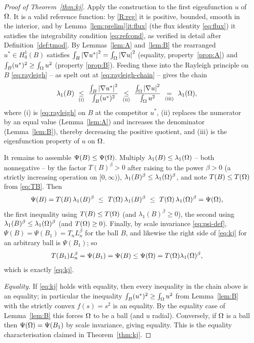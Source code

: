 \begin{proof}[Proof of Theorem~\ref{thm:kj}]
Apply the construction to the first eigenfunction $u$ of $\Omega$. It is a
valid reference function: by \ref{R:reg} it is positive, bounded, smooth in
the interior, and by Lemma~\ref{lem:prelim}\ref{it:flux} (the flux identity
\eqref{eq:flux}) it satisfies the integrability condition
\eqref{eq:refcond}, as verified in detail after Definition~\ref{def:tmod}.
By Lemmas~\ref{lem:A} and~\ref{lem:B} the rearranged $u^*\in H^1_0(B)$
satisfies $\int_B\left|\nabla u^*\right|^2=\int_\Omega\left|\nabla u\right|^2$ (equality,
property~\ref{prop:A}) and $\int_B(u^*)^2\ge\int_\Omega u^2$ (property
\ref{prop:B}). Feeding these into the Rayleigh principle on $B$
\eqref{eq:rayleigh} -- as spelt out at \eqref{eq:rayleigh-chain} -- gives the
chain
\[
  \lambda_1(B)
  \ \underset{\text{(i)}}{\le}\
  \frac{\int_B\left|\nabla u^*\right|^2}{\int_B(u^*)^2}
  \ \underset{\text{(ii)}}{\le}\
  \frac{\int_\Omega\left|\nabla u\right|^2}{\int_\Omega u^2}
  \ \underset{\text{(iii)}}{=}\
  \lambda_1(\Omega),
\]
where (i) is \eqref{eq:rayleigh} on $B$ at the competitor $u^*$, (ii)
replaces the numerator by an equal value (Lemma~\ref{lem:A}) and increases
the denominator (Lemma~\ref{lem:B}), thereby decreasing the positive
quotient, and (iii) is the eigenfunction property of $u$ on $\Omega$.

It remains to assemble $\Psi(B)\le\Psi(\Omega)$. Multiply
$\lambda_1(B)\le\lambda_1(\Omega)$ -- both nonnegative -- by the factor
$T(B)^{\beta}>0$ after raising to the power $\beta>0$ (a strictly increasing
operation on $[0,\infty)$), $\lambda_1(B)^\beta\le\lambda_1(\Omega)^\beta$, and
note $T(B)\le T(\Omega)$ from \eqref{eq:TB}. Then
\[
  \Psi(B)=T(B)\,\lambda_1(B)^\beta
  \ \le\ T(\Omega)\,\lambda_1(B)^\beta
  \ \le\ T(\Omega)\,\lambda_1(\Omega)^\beta=\Psi(\Omega),
\]
the first inequality using $T(B)\le T(\Omega)$ (and $\lambda_1(B)^\beta\ge0$),
the second using $\lambda_1(B)^\beta\le\lambda_1(\Omega)^\beta$ (and
$T(\Omega)\ge0$). Finally, by scale invariance \eqref{eq:psi-def},
$\Psi(B)=\Psi(B_1)=T_n L_n^\beta$ for the ball $B$, and likewise the right
side of \eqref{eq:kj} for an arbitrary ball is $\Psi(B_1)$; so
\[
  T(B_1)L_n^\beta=\Psi(B_1)=\Psi(B)\le\Psi(\Omega)=T(\Omega)\lambda_1(\Omega)^\beta,
\]
which is exactly \eqref{eq:kj}.

\emph{Equality.} If \eqref{eq:kj} holds with equality, then every
inequality in the chain above is an equality; in particular the inequality
$\int_B(u^*)^2\ge\int_\Omega u^2$ from Lemma~\ref{lem:B} with the strictly
convex $f(s)=s^2$ is an equality. By the equality case of Lemma~\ref{lem:B}
this forces $\Omega$ to be a ball (and $u$ radial). Conversely, if $\Omega$ is a
ball then $\Psi(\Omega)=\Psi(B_1)$ by scale invariance, giving equality. This
is the equality characterisation claimed in Theorem~\ref{thm:kj}.
\end{proof}

